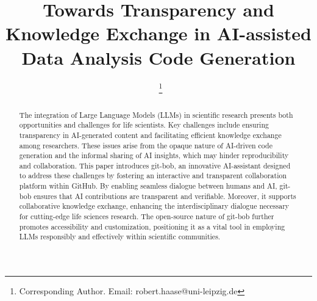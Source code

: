 \documentclass{ecai}
\begin{document}
\linenumbers %


\begin{frontmatter}




\title{Towards Transparency and Knowledge Exchange in AI-assisted Data Analysis Code Generation}


\author[A,B]{~\thanks{Corresponding Author. Email: robert.haase@uni-leipzig.de}}

\address[A]{Data Science Center, Leipzig University, Humboldtstra{\ss}e 25, 04105 Leipzig, Germany}
\address[B]{Center for Scalable Data Analytics and Artificial Intelligence (ScaDS.AI) Dresden / Leipzig}


\begin{abstract}

The integration of Large Language Models (LLMs) in scientific research presents both opportunities and challenges for life scientists. Key challenges include ensuring transparency in AI-generated content and facilitating efficient knowledge exchange among researchers. These issues arise from the opaque nature of AI-driven code generation and the informal sharing of AI insights, which may hinder reproducibility and collaboration. This paper introduces git-bob, an innovative AI-assistant designed to address these challenges by fostering an interactive and transparent collaboration platform within GitHub. By enabling seamless dialogue between humans and AI, git-bob ensures that AI contributions are transparent and verifiable. Moreover, it supports collaborative knowledge exchange, enhancing the interdisciplinary dialogue necessary for cutting-edge life sciences research. The open-source nature of git-bob further promotes accessibility and customization, positioning it as a vital tool in employing LLMs responsibly and effectively within scientific communities.

\end{abstract}

\end{frontmatter}
\end{document}
